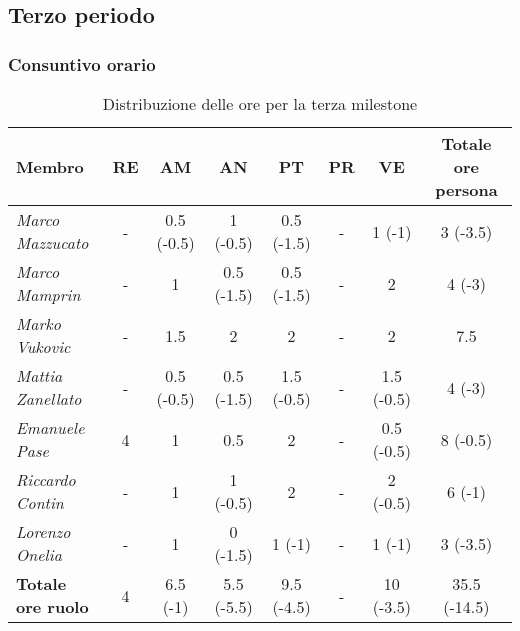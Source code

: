 \subsection{Terzo periodo}

\subsubsection{Consuntivo orario}
\begin{table}[H]
    \centering
    \begin{tabular}{|l|c|c|c|c|c|c|c|}
    \hline
    \textbf{Membro} & \multicolumn{1}{c|}{\textbf{RE}} & \multicolumn{1}{c|}{\textbf{AM}} & \multicolumn{1}{c|}{\textbf{AN}} & \multicolumn{1}{c|}{\textbf{PT}} & \multicolumn{1}{c|}{\textbf{PR}} & \multicolumn{1}{c|}{\textbf{VE}} & \multicolumn{1}{c|}{\textbf{Totale ore persona}} \\ \hline
    \textit{Marco Mazzucato}  & -    & 0.5 (-0.5)     & 1 (-0.5)  & 0.5 (-1.5)   & - & 1 (-1)        & 3 (-3.5)       \\ \hline
    \textit{Marco Mamprin}    & -    & 1            & 0.5 (-1.5)    & 0.5 (-1.5)   & - & 2             & 4 (-3)           \\ \hline
    \textit{Marko Vukovic}    & -    & 1.5          & 2           & 2          & - & 2             & 7.5              \\ \hline
    \textit{Mattia Zanellato} & -    & 0.5 (-0.5)     & 0.5 (-1.5)    & 1.5 (-0.5)   & - & 1.5 (-0.5)      & 4 (-3)           \\ \hline
    \textit{Emanuele Pase}    & 4    & 1            & 0.5         & 2          & - & 0.5 (-0.5)      & 8 (-0.5)       \\ \hline
    \textit{Riccardo Contin}  & -    & 1            & 1 (-0.5)  & 2          & - & 2 (-0.5)    & 6 (-1)           \\ \hline
    \textit{Lorenzo Onelia}   & -    & 1            & 0 (-1.5)  & 1 (-1)     & - & 1 (-1)        & 3 (-3.5)       \\ \hline
    \textbf{Totale ore ruolo} & 4    & 6.5 (-1)     & 5.5 (-5.5)   & 9.5 (-4.5)  & - & 10 (-3.5)   & 35.5 (-14.5)       \\ \hline
    \end{tabular}
  \caption{Distribuzione delle ore per la terza milestone}
\end{table}

